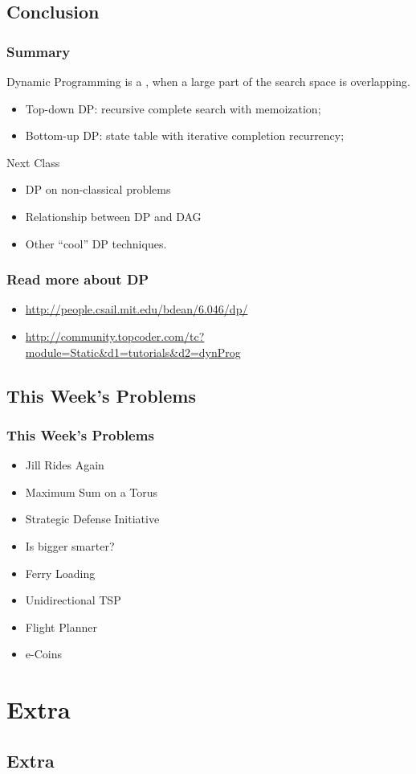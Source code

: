 \documentclass{beamer}
\begin{document}
\subsection{Conclusion}
\begin{frame}
   \frametitle{Summary} 

   Dynamic Programming is a , when a large part of the search space is overlapping.

   \begin{itemize}
   \item \alert{Top-down DP}: recursive complete search with memoization;
   \item \alert{Bottom-up DP}: state table with iterative completion recurrency;
   \end{itemize}

   \vfill

   \begin{block}{Next Class}
     \begin{itemize}
     \item DP on non-classical problems
     \item Relationship between DP and DAG
     \item Other ``cool'' DP techniques.
     \end{itemize}
   \end{block}
\end{frame}

\begin{frame}
   \frametitle{Read more about DP}
   \begin{itemize}
      \item \url{http://people.csail.mit.edu/bdean/6.046/dp/}
      \item \url{http://community.topcoder.com/tc?module=Static&d1=tutorials&d2=dynProg}
   \end{itemize}
\end{frame}

\subsection{This Week's Problems}
\begin{frame}
   \frametitle{This Week's Problems}
   \begin{itemize}
   \item Jill Rides Again
   \item Maximum Sum on a Torus
   \item Strategic Defense Initiative
   \item Is bigger smarter?
   \item Ferry Loading
   \item Unidirectional TSP
   \item Flight Planner
   \item e-Coins
   \end{itemize}
\end{frame}


\section{Extra}
\subsection{Extra}

\end{document}
